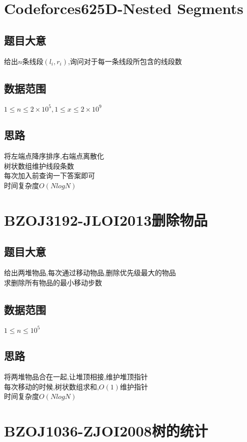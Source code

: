 \documentclass{ctexart}
\numberwithin{equation}{section}
\begin{document}
\begin{flushleft}
  \section{Codeforces625D-Nested Segments}
  \subsection{题目大意}
  给出$n$条线段$(l_i,r_i)$,询问对于每一条线段所包含的线段数 \\
  \subsection{数据范围}
  $1\le n\le 2\times 10^5,1\le x\le 2\times 10^9$ \\
  \subsection{思路}
  将左端点降序排序,右端点离散化 \\
  树状数组维护线段条数\\
  每次加入前查询一下答案即可\\
  时间复杂度$O(NlogN)$ \\
  \newpage

  \section{BZOJ3192-JLOI2013删除物品}
  \subsection{题目大意}
  给出两堆物品,每次通过移动物品,删除优先级最大的物品 \\
  求删除所有物品的最小移动步数 \\
  \subsection{数据范围}
  $1\le n\le 10^5$ \\
  \subsection{思路}
  将两堆物品合在一起,让堆顶相接,维护堆顶指针\\
  每次移动的时候,树状数组求和,$O(1)$维护指针 \\
  时间复杂度$O(NlogN)$ \\
  \newpage

  \section{BZOJ1036-ZJOI2008树的统计}

\end{flushleft}
\end{document}
